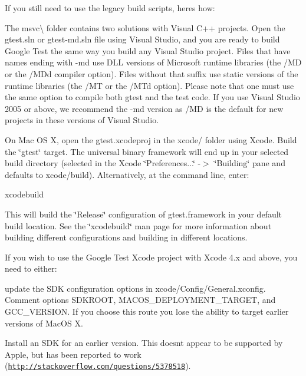 If you still need to use the legacy build scripts, here\textquotesingle{}s how\+:

The msvc\textbackslash{} folder contains two solutions with Visual C++ projects. Open the {\ttfamily gtest.\+sln} or {\ttfamily gtest-\/md.\+sln} file using Visual Studio, and you are ready to build Google Test the same way you build any Visual Studio project. Files that have names ending with -\/md use D\+LL versions of Microsoft runtime libraries (the /\+MD or the /\+M\+Dd compiler option). Files without that suffix use static versions of the runtime libraries (the /\+MT or the /\+M\+Td option). Please note that one must use the same option to compile both gtest and the test code. If you use Visual Studio 2005 or above, we recommend the -\/md version as /\+MD is the default for new projects in these versions of Visual Studio.

On Mac OS X, open the {\ttfamily gtest.\+xcodeproj} in the {\ttfamily xcode/} folder using Xcode. Build the \char`\"{}gtest\char`\"{} target. The universal binary framework will end up in your selected build directory (selected in the Xcode \char`\"{}\+Preferences...\char`\"{} -\/$>$ \char`\"{}\+Building\char`\"{} pane and defaults to xcode/build). Alternatively, at the command line, enter\+: \begin{DoxyVerb}xcodebuild
\end{DoxyVerb}


This will build the \char`\"{}\+Release\char`\"{} configuration of gtest.\+framework in your default build location. See the \char`\"{}xcodebuild\char`\"{} man page for more information about building different configurations and building in different locations.

If you wish to use the Google Test Xcode project with Xcode 4.\+x and above, you need to either\+:


\begin{DoxyItemize}
\item update the S\+DK configuration options in xcode/\+Config/\+General.\+xconfig. Comment options {\ttfamily S\+D\+K\+R\+O\+OT}, {\ttfamily M\+A\+C\+O\+S\+\_\+\+D\+E\+P\+L\+O\+Y\+M\+E\+N\+T\+\_\+\+T\+A\+R\+G\+ET}, and {\ttfamily G\+C\+C\+\_\+\+V\+E\+R\+S\+I\+ON}. If you choose this route you lose the ability to target earlier versions of Mac\+OS X.
\item Install an S\+DK for an earlier version. This doesn\textquotesingle{}t appear to be supported by Apple, but has been reported to work (\href{http://stackoverflow.com/questions/5378518}{\tt http\+://stackoverflow.\+com/questions/5378518}).
\end{DoxyItemize}

